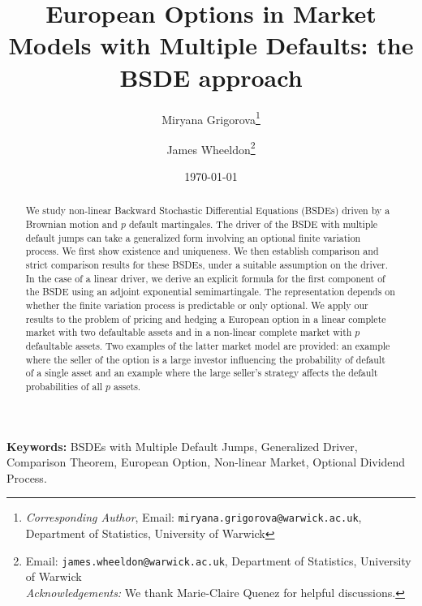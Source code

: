\documentclass[11pt,a4paper]{article}
\numberwithin{equation}{section}
\theoremstyle{newPlain}
\theoremstyle{newDefinition}
\theoremstyle{newRemark}
\begin{document}
\title{European Options in Market Models with Multiple Defaults: the BSDE approach}

\author{
  Miryana Grigorova\thanks{\textit{Corresponding Author}, Email: \texttt{miryana.grigorova@warwick.ac.uk},  Department of Statistics, University of Warwick} \and
  James Wheeldon\thanks{Email: \texttt{james.wheeldon@warwick.ac.uk}, Department of Statistics, University of Warwick\\\textit{Acknowledgements:} We thank Marie-Claire Quenez for helpful discussions.} 
}
 
\date{\today}  %

\maketitle

\begin{abstract}
We study non-linear Backward Stochastic Differential Equations (BSDEs) driven by a Brownian motion and $p$ default martingales. The driver of the BSDE with multiple default jumps can take a generalized form involving an optional finite variation process.  We first show existence and uniqueness. We then  establish comparison and strict comparison results for these BSDEs, under a suitable assumption on the driver. In the case of a linear driver, we derive an explicit formula for the first component of the BSDE using an adjoint exponential semimartingale. The representation depends on whether the finite variation process is predictable or only optional. We apply our results  to the problem of pricing and hedging a European option in a linear complete market with two defaultable assets and in  a non-linear complete market with $p$ defaultable assets. Two examples of the latter market model are provided: an example where the seller of the option is a large investor  influencing the probability of default of a single asset and  an example   where the large seller’s strategy affects the default probabilities of all $p$ assets.
\end{abstract}

\bigskip

\noindent\textbf{Keywords:} BSDEs with Multiple Default Jumps, Generalized Driver, Comparison Theorem, European Option, Non-linear Market, Optional Dividend Process.

\newpage

\end{document}

